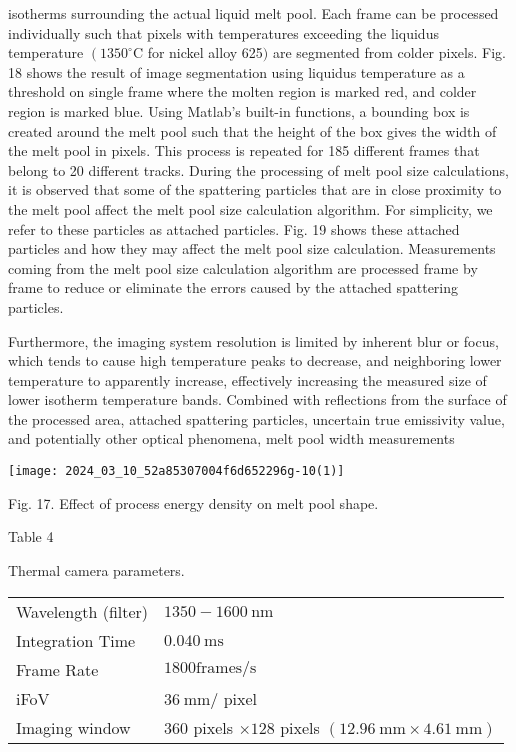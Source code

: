 \documentclass[10pt]{article}
\begin{document}
isotherms surrounding the actual liquid melt pool. Each frame can be processed individually such that pixels with temperatures exceeding the liquidus temperature $\left(1350^{\circ} \mathrm{C}\right.$ for nickel alloy 625$)$ are segmented from colder pixels. Fig. 18 shows the result of image segmentation using liquidus temperature as a threshold on single frame where the molten region is marked red, and colder region is marked blue. Using Matlab's built-in functions, a bounding box is created around the melt pool such that the height of the box gives the width of the melt pool in pixels. This process is repeated for 185 different frames that belong to 20 different tracks. During the processing of melt pool size calculations, it is observed that some of the spattering particles that are in close proximity to the melt pool affect the melt pool size calculation algorithm. For simplicity, we refer to these particles as attached particles. Fig. 19 shows these attached particles and how they may affect the melt pool size calculation. Measurements coming from the melt pool size calculation algorithm are processed frame by frame to reduce or eliminate the errors caused by the attached spattering particles.

Furthermore, the imaging system resolution is limited by inherent blur or focus, which tends to cause high temperature peaks to decrease, and neighboring lower temperature to apparently increase, effectively increasing the measured size of lower isotherm temperature bands. Combined with reflections from the surface of the processed area, attached spattering particles, uncertain true emissivity value, and potentially other optical phenomena, melt pool width measurements

\begin{center}
\texttt{[image: 2024\_03\_10\_52a85307004f6d652296g-10(1)]}
\end{center}

Fig. 17. Effect of process energy density on melt pool shape.

Table 4

Thermal camera parameters.

\begin{center}
\begin{tabular}{ll}
\hline
Wavelength (filter) & $1350-1600 \mathrm{~nm}$ \\
Integration Time & $0.040 \mathrm{~ms}$ \\
Frame Rate & $1800 \mathrm{frames} / \mathrm{s}$ \\
iFoV & $36 \mathrm{~mm} /$ pixel \\
Imaging window & 360 pixels $\times 128$ pixels $(12.96 \mathrm{~mm} \times 4.61 \mathrm{~mm})$ \\
\end{tabular}
\end{center}
\end{document}
